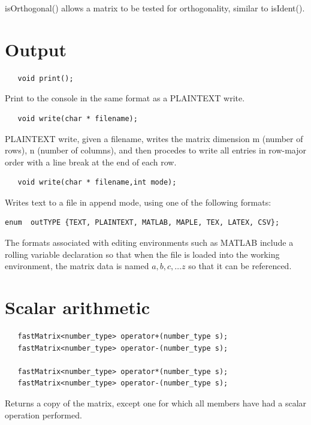 \documentclass[10pt,fullpage]{article}
\begin{document}
isOrthogonal() allows a matrix to be tested for orthogonality,
similar to isIdent().

\section{Output}

\begin{verbatim}
   void print();
\end{verbatim}

Print to the console in the same format as a PLAINTEXT write.

\begin{verbatim}
   void write(char * filename);
\end{verbatim}

PLAINTEXT write, given a filename, writes the matrix dimension m
(number of rows), n (number of columns), and then procedes to write
all entries in row-major order with a line break at the end of each
row.

\begin{verbatim}
   void write(char * filename,int mode);
\end{verbatim}

Writes text to a file in append mode, using one of the following
formats:

\begin{verbatim}
enum  outTYPE {TEXT, PLAINTEXT, MATLAB, MAPLE, TEX, LATEX, CSV};
\end{verbatim}

The formats associated with editing environments such as MATLAB
include a rolling variable declaration so that when the file is
loaded into the working environment, the matrix data is named
$a,b,c,\ldots z$ so that it can be referenced.

\section{Scalar arithmetic}

\begin{verbatim}
   fastMatrix<number_type> operator+(number_type s);
   fastMatrix<number_type> operator-(number_type s);

   fastMatrix<number_type> operator*(number_type s);
   fastMatrix<number_type> operator-(number_type s);
\end{verbatim}

Returns a copy of the matrix, except one for which all members have
had a scalar operation performed.
\end{document}
